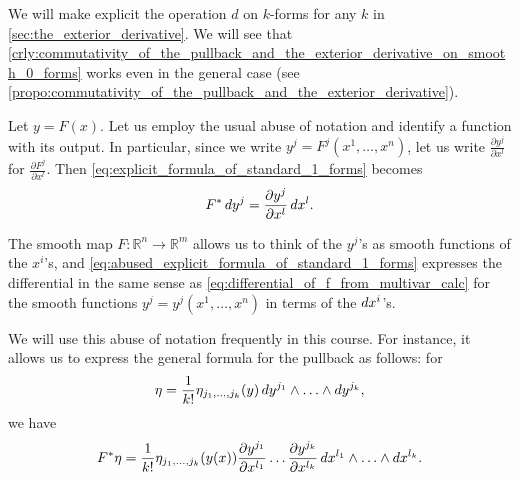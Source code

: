 \documentclass[notoc,notitlepage]{tufte-book}
\begin{document}
We will make explicit the operation $d$ on $k$-forms for any $k$ in
\cref{sec:the_exterior_derivative}. We will see that
\cref{crly:commutativity_of_the_pullback_and_the_exterior_derivative_on_smooth_0_forms}
works even in the general case (see
\cref{propo:commutativity_of_the_pullback_and_the_exterior_derivative}).

\begin{note}
  Let $y = F(x)$. Let us employ the usual abuse of notation and identify a function with
  its output. In particular, since we write $y^j = F^j(x^1, \ldots, x^n)$, let us write
  $\frac{\partial y^j}{\partial x^l}$ for $\frac{\partial F^j}{\partial x^l}$. Then
  \cref{eq:explicit_formula_of_standard_1_forms} becomes
  \begin{equation}\label{eq:abused_explicit_formula_of_standard_1_forms}
    F^* \mathop{}\!d{y^j} = \frac{\partial y^j}{\partial x^l} \mathop{}\!d{x^l}.
  \end{equation}

  \noindent
   The
  smooth map $F : \mathbb{R}^n \to \mathbb{R}^m$ allows us to think of the $y^j$'s as
  smooth functions of the $x^i$'s, and
  \cref{eq:abused_explicit_formula_of_standard_1_forms} expresses the differential in the
  same sense as \cref{eq:differential_of_f_from_multivar_calc} for the smooth functions
  $y^j = y^j(x^1, \ldots, x^n)$ in terms of the $\mathop{}\!d{x^i}$'s.
\end{note}

We will use this abuse of notation frequently in this course. For instance, it allows us
to express the general formula for the pullback as follows: for 
\begin{equation*}
  \eta = \frac{1}{k!} \eta_{j_1, \ldots, j_k} (y) \mathop{}\!d{y^{j_1}} \land \hdots \land
  \mathop{}\!d{y^{j_k}},
\end{equation*}
we have
\begin{equation*}
  F^* \eta = \frac{1}{k!} \eta_{j_1, \ldots, j_k}(y(x)) \frac{\partial y^{j_1}}{\partial
    x^{l_1}} \hdots \frac{\partial y^{j_k}}{\partial x^{l_k}} \mathop{}\!d{x^{l_1}} \land \hdots
    \land \mathop{}\!d{x^{l_k}}.
\end{equation*}
\end{document}
